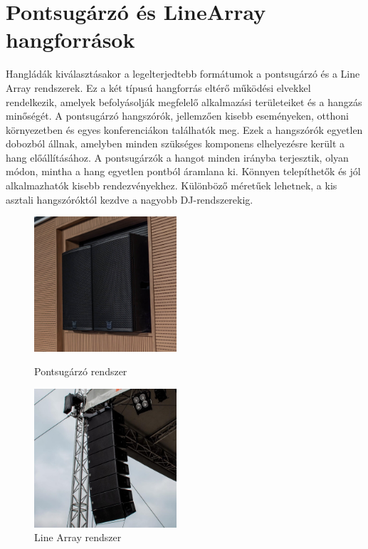 \section{Pontsugárzó és LineArray hangforrások} %
Hangládák kiválasztásakor a legelterjedtebb formátumok a pontsugárzó és a Line Array rendszerek.
Ez a két típusú hangforrás eltérő működési elvekkel rendelkezik, 
amelyek befolyásolják megfelelő alkalmazási területeiket és a hangzás minőségét.
A pontsugárzó hangszórók, jellemzően kisebb eseményeken, 
otthoni környezetben és egyes konferenciákon találhatók meg. Ezek a hangszórók egyetlen 
dobozból állnak, amelyben minden szükséges komponens elhelyezésre került a hang előállításához. 
A pontsugárzók a hangot minden irányba terjesztik, olyan módon, mintha a hang egyetlen pontból áramlana ki. 
Könnyen telepíthetők és jól alkalmazhatók kisebb rendezvényekhez. Különböző méretűek 
lehetnek, a kis asztali hangszóróktól kezdve a nagyobb DJ-rendszerekig.
\begin{figure}[H]
	\begin{minipage}{0.5\textwidth}
		\centering
		\includegraphics[width=200px, keepaspectratio]{figures/point_source.jpg}
        \caption{Pontsugárzó rendszer}
        \label{fig:point_source}
	\end{minipage}%
	\begin{minipage}{0.5\textwidth}
		\centering
		\includegraphics[width=200px, keepaspectratio]{figures/line_array.jpg}
		\caption{Line Array rendszer}
        \label{fig:line_array}
	\end{minipage}
\end{figure}
